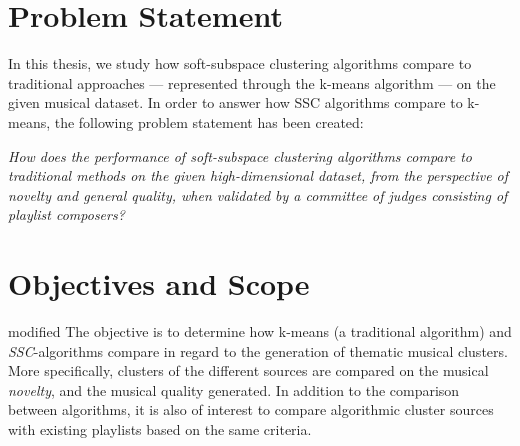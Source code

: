 \documentclass[../report.tex]{subfiles}
\begin{document}




\section{Problem Statement}

In this thesis, we study how soft-subspace clustering algorithms compare to traditional approaches --- represented through the k-means algorithm --- on the given musical dataset. In order to answer how SSC algorithms compare to k-means, the following problem statement has been created:


\textit{How does the performance of soft-subspace clustering algorithms compare to traditional methods on the given high-dimensional dataset, from the perspective of novelty and general quality, when validated by a committee of judges consisting of playlist composers?}

\section{Objectives and Scope}
\begin{color}{modified}
  The objective is to determine how k-means (a traditional algorithm) and \textit{SSC}-algorithms compare in regard to the generation of thematic musical clusters. More specifically, clusters of the different sources are compared on the musical \textit{novelty}, and the musical quality generated. In addition to the comparison between algorithms, it is also of interest to compare algorithmic cluster sources with existing playlists based on the same criteria.
\end{color}
\end{document}
